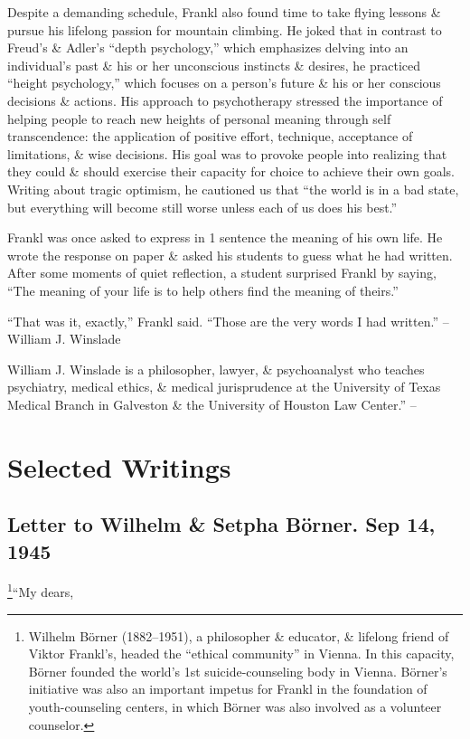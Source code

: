 \documentclass{article}
\numberwithin{equation}{section}
\begin{document}
Despite a demanding schedule, Frankl also found time to take flying lessons \& pursue his lifelong passion for mountain climbing. He joked that in contrast to Freud's  \& Adler's ``depth psychology,'' which emphasizes delving into an individual's past \& his or her unconscious instincts \& desires, he practiced ``height psychology,'' which focuses on a person's future \& his or her conscious decisions \& actions. His approach to psychotherapy stressed the importance of helping people to reach new heights of personal meaning through self transcendence: the application of positive effort, technique, acceptance of limitations, \& wise decisions. His goal was to provoke people into realizing that they could \& should exercise their capacity for choice to achieve their own goals. Writing about tragic optimism, he cautioned us that ``the world is in a bad state, but everything will become still worse unless each of us does his best.''

Frankl was once asked to express in 1 sentence the meaning of his own life. He wrote the response on paper \& asked his students to guess what he had written. After some moments of quiet reflection, a student surprised Frankl by saying, ``The meaning of your life is to help others find the meaning of theirs.'' 

``That was it, exactly,'' Frankl said. ``Those are the very words I had written.'' -- William J. Winslade

William J. Winslade is a philosopher, lawyer, \& psychoanalyst who teaches psychiatry, medical ethics, \& medical jurisprudence at the University of Texas Medical Branch in Galveston \& the University of Houston Law Center.'' -- \cite[pp. 108--116]{Frankl2017}


\section{Selected Writings}

\subsection{Letter to Wilhelm \& Setpha B\"orner. Sep 14, 1945}
\footnote{Wilhelm B\"orner (1882--1951), a philosopher \& educator, \& lifelong friend of Viktor Frankl's, headed the ``ethical community'' in Vienna. In this capacity, B\"orner founded the world's 1st suicide-counseling body in Vienna. B\"orner's initiative was also an important impetus for Frankl in the foundation of youth-counseling centers, in which B\"orner was also involved as a volunteer counselor.}``My dears,
\end{document}
